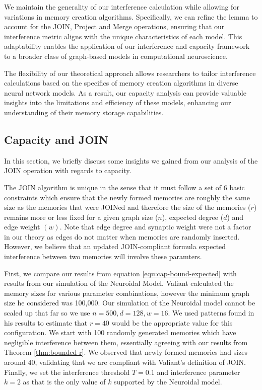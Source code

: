 We maintain the generality of our interference calculation while allowing for variations in memory creation algorithms. Specifically, we can refine the lemma to account for the JOIN, Project and Merge operations, ensuring that our interference metric aligns with the unique characteristics of each model. This adaptability enables the application of our interference and capacity framework to a broader class of graph-based models in computational neuroscience.

The flexibility of our theoretical approach allows researchers to tailor interference calculations based on the specifics of memory creation algorithms in diverse neural network models. As a result, our capacity analysis can provide valuable insights into the limitations and efficiency of these models, enhancing our understanding of their memory storage capabilities.

\subsection{Capacity and JOIN}

In this section, we briefly discuss some insights we gained from our analysis of the JOIN operation with regards to capacity. 

The JOIN algorithm is unique in the sense that it must follow a set of 6 basic constraints which ensure that the newly formed memories are roughly the same size as the memories that were JOINed and therefore the size of the memories ($r$) remains more or less fixed for a given graph size ($n$), expected degree ($d$) and edge weight $(w)$. Note that edge degree and synaptic weight were not a factor in our theory as edges do not matter when memories are randomly inserted. However, we believe that an updated JOIN-compliant formula expected interference between two memories will involve these paramters. 

First, we compare our results from equation \ref{equ:cap-bound-expected} with results from our simulation of the Neuroidal Model. Valiant calculated the memory sizes for various parameter combinations, however the minimum graph size he considered was 100,000. Our simulation of the Neuroidal model cannot be scaled up that far so we use $n = 500, d = 128, w = 16$. We used patterns found in his results to estimate that $r = 40$ would be the appropriate value for this configuration. We start with 100 randomly generated memories which have negligible interference between them, essentially agreeing with our results from Theorem \ref{thm:bounded-r}. We observed that newly formed memories had sizes around $40$, validating that we are compliant with Valiant's definition of JOIN. Finally, we set the interference threshold $T = 0.1$ and interference parameter $k = 2$ as that is the only value of $k$ supported by the Neuroidal model. 

